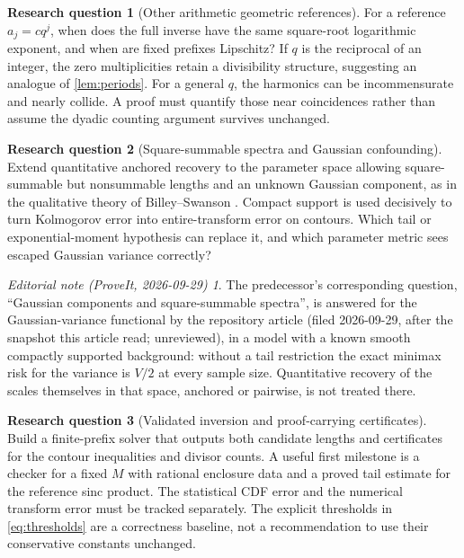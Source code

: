 \documentclass[11pt,a4paper]{article}
\numberwithin{equation}{section}
\theoremstyle{definition}
\newtheorem{question}{Research question}
\theoremstyle{remark}
\newtheorem*{ednote}{Editorial note (ProveIt, 2026-09-29)}
\begin{document}
\begin{question}[Other arithmetic geometric references]
For a reference $a_j=cq^j$, when does the full inverse have the same
square-root logarithmic exponent, and when are fixed prefixes Lipschitz?
If $q$ is the reciprocal of an integer, the zero multiplicities retain a
divisibility structure, suggesting an analogue of \cref{lem:periods}.
For a general $q$, the harmonics can be incommensurate and nearly collide.
A proof must quantify those near coincidences rather than assume the dyadic
counting argument survives unchanged.
\end{question}

\begin{question}[Square-summable spectra and Gaussian confounding]
Extend quantitative anchored recovery to the parameter space allowing
square-summable but nonsummable lengths and an unknown Gaussian component,
as in the qualitative theory of Billey--Swanson \cite{billey}. Compact
support is used decisively to turn Kolmogorov error into entire-transform
error on contours. Which tail or exponential-moment hypothesis can replace
it, and which parameter metric sees escaped Gaussian variance correctly?
\end{question}
\begin{ednote}
The predecessor's corresponding question, ``Gaussian components and
square-summable spectra'', is answered for the Gaussian-variance functional
by the repository article
(filed 2026-09-29, after the snapshot this article read; unreviewed), in a
model with a known smooth compactly supported background: without a tail
restriction the exact minimax risk for the variance is $V/2$ at every
sample size. Quantitative recovery of the scales themselves in that space,
anchored or pairwise, is not treated there.
\end{ednote}

\begin{question}[Validated inversion and proof-carrying certificates]
Build a finite-prefix solver that outputs both candidate lengths and
certificates for the contour inequalities and divisor counts. A useful first
milestone is a checker for a fixed $M$ with rational enclosure data and a
proved tail estimate for the reference sinc product. The statistical CDF
error and the numerical transform error must be tracked separately. The
explicit thresholds in \eqref{eq:thresholds} are a correctness baseline,
not a recommendation to use their conservative constants unchanged.
\end{question}
\end{document}
